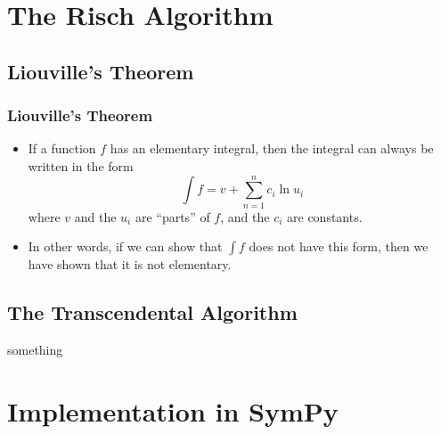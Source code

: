 \documentclass{beamer}
\numberwithin{equation}{section} %
\begin{document}
\section{The Risch Algorithm}

\subsection{Liouville's Theorem}

\begin{frame}
    \frametitle{Liouville's Theorem}
    \begin{itemize}
        \item If a function $f$ has an elementary integral, then the
        integral can always be written in the form
        \begin{equation}
            \label{liouville's theorem}
            \int{f} = v + \sum_{n=1}^n{c_i\ln{u_i}}
        \end{equation}
        where $v$ and the $u_i$ are ``parts'' of $f$, and the $c_i$ are
        constants.
        \pause
        \item In other words, if we can show that $\int{f}$ does not
        have this form, then we have shown that it is not elementary.
    \end{itemize}
\end{frame}

\subsection{The Transcendental Algorithm}

\begin{frame}
    something
\end{frame}

\section{Implementation in SymPy}
\end{document}
